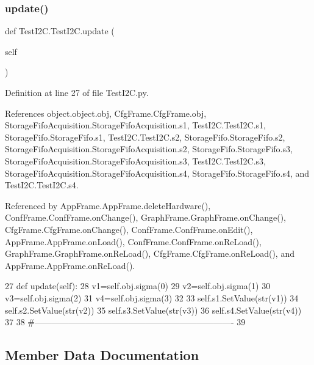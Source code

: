 \subsubsection{\texorpdfstring{update()}{update()}}
{\footnotesize\ttfamily def Test\+I2\+C.\+Test\+I2\+C.\+update (\begin{DoxyParamCaption}\item[{}]{self }\end{DoxyParamCaption})}



Definition at line 27 of file Test\+I2\+C.\+py.



References object.\+object.\+obj, Cfg\+Frame.\+Cfg\+Frame.\+obj, Storage\+Fifo\+Acquisition.\+Storage\+Fifo\+Acquisition.\+s1, Test\+I2\+C.\+Test\+I2\+C.\+s1, Storage\+Fifo.\+Storage\+Fifo.\+s1, Test\+I2\+C.\+Test\+I2\+C.\+s2, Storage\+Fifo.\+Storage\+Fifo.\+s2, Storage\+Fifo\+Acquisition.\+Storage\+Fifo\+Acquisition.\+s2, Storage\+Fifo.\+Storage\+Fifo.\+s3, Storage\+Fifo\+Acquisition.\+Storage\+Fifo\+Acquisition.\+s3, Test\+I2\+C.\+Test\+I2\+C.\+s3, Storage\+Fifo\+Acquisition.\+Storage\+Fifo\+Acquisition.\+s4, Storage\+Fifo.\+Storage\+Fifo.\+s4, and Test\+I2\+C.\+Test\+I2\+C.\+s4.



Referenced by App\+Frame.\+App\+Frame.\+delete\+Hardware(), Conf\+Frame.\+Conf\+Frame.\+on\+Change(), Graph\+Frame.\+Graph\+Frame.\+on\+Change(), Cfg\+Frame.\+Cfg\+Frame.\+on\+Change(), Conf\+Frame.\+Conf\+Frame.\+on\+Edit(), App\+Frame.\+App\+Frame.\+on\+Load(), Conf\+Frame.\+Conf\+Frame.\+on\+Re\+Load(), Graph\+Frame.\+Graph\+Frame.\+on\+Re\+Load(), Cfg\+Frame.\+Cfg\+Frame.\+on\+Re\+Load(), and App\+Frame.\+App\+Frame.\+on\+Re\+Load().


\begin{DoxyCode}
27     \textcolor{keyword}{def }update(self):
28         v1=self.obj.sigma(0)
29         v2=self.obj.sigma(1)
30         v3=self.obj.sigma(2)
31         v4=self.obj.sigma(3)
32 
33         self.s1.SetValue(str(v1))
34         self.s2.SetValue(str(v2))
35         self.s3.SetValue(str(v3))
36         self.s4.SetValue(str(v4))        
37 
38 \textcolor{comment}{#----------------------------------------------------------------------}
39 
\end{DoxyCode}


\subsection{Member Data Documentation}
\mbox{\label{classTestI2C_1_1TestI2C_a74973f987e57f6b47208b6a7438c951f}} 
